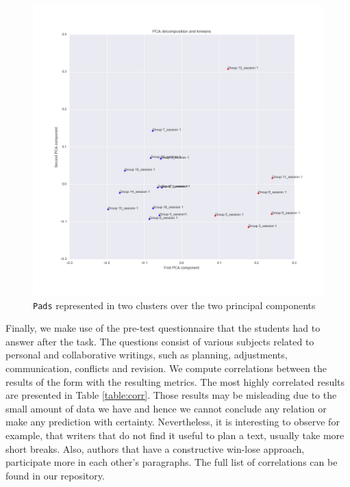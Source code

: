 \documentclass[a4, twocolumn, 12pt]{article}
\begin{document}
\begin{figure}[h]
\centering
\includegraphics[scale=0.27]{figures/PCA_kmeans.png}
\caption{\texttt{Pads} represented in two clusters over the two principal components}
\label{PCA_kmeans}
\end{figure}
Finally, we make use of the pre-test questionnaire that the students had to answer after the task. The questions consist of various subjects related to personal and collaborative writings, such as planning, adjustments, communication, conflicts and revision. We compute correlations between the results of the form with the resulting metrics. The most highly correlated results are presented in Table \ref{table:corr}. Those results may be misleading due to the small amount of data we have and hence we cannot conclude any relation or make any prediction with certainty. Nevertheless, it is interesting to observe for example, that writers that do not find it useful to plan a text, usually take more short breaks. Also, authors that have a constructive win-lose approach, participate more in each other’s paragraphs. The full list of correlations can be found in our repository.
\end{document}
